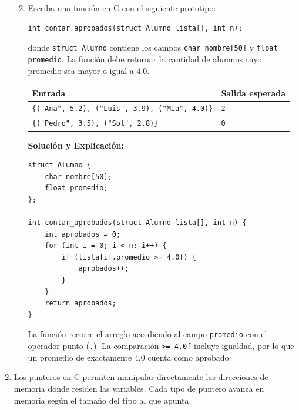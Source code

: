 \documentclass[11pt,letterpaper]{article}
\begin{document}
\begin{enumerate}[label=\textbf{\arabic*.}]
\begin{enumerate}[label=(\alph*), resume]
        \vspace{0.3cm}
        \item Escriba una función en C con el siguiente prototipo:
        \begin{lstlisting}[style=customc, numbers=none]
int contar_aprobados(struct Alumno lista[], int n);
        \end{lstlisting}
        donde \texttt{struct Alumno} contiene los campos \texttt{char nombre[50]} y \texttt{float promedio}. La función debe retornar la cantidad de alumnos cuyo promedio sea mayor o igual a $4.0$.

        \begin{center}
        \begin{tabular}{ll}
        \toprule
        \textbf{Entrada} & \textbf{Salida esperada} \\
        \midrule
        \texttt{\{("Ana", 5.2), ("Luis", 3.9), ("Mia", 4.0)\}} & \texttt{2} \\
        \texttt{\{("Pedro", 3.5), ("Sol", 2.8)\}} & \texttt{0} \\
        \bottomrule
        \end{tabular}
        \end{center}

        \begin{solucionbox}
        \textbf{Solución y Explicación:}

        \begin{lstlisting}[style=customc]
struct Alumno {
    char nombre[50];
    float promedio;
};

int contar_aprobados(struct Alumno lista[], int n) {
    int aprobados = 0;
    for (int i = 0; i < n; i++) {
        if (lista[i].promedio >= 4.0f) {
            aprobados++;
        }
    }
    return aprobados;
}
        \end{lstlisting}
        \noindent La función recorre el arreglo accediendo al campo \texttt{promedio} con el operador punto (\texttt{.}). La comparación \texttt{>= 4.0f} incluye igualdad, por lo que un promedio de exactamente $4.0$ cuenta como aprobado.
        \end{solucionbox}
    \end{enumerate}

    \newpage
    \item Los punteros en C permiten manipular directamente las direcciones de memoria donde residen las variables. Cada tipo de puntero avanza en memoria según el tamaño del tipo al que apunta.


\end{enumerate}
\end{document}
